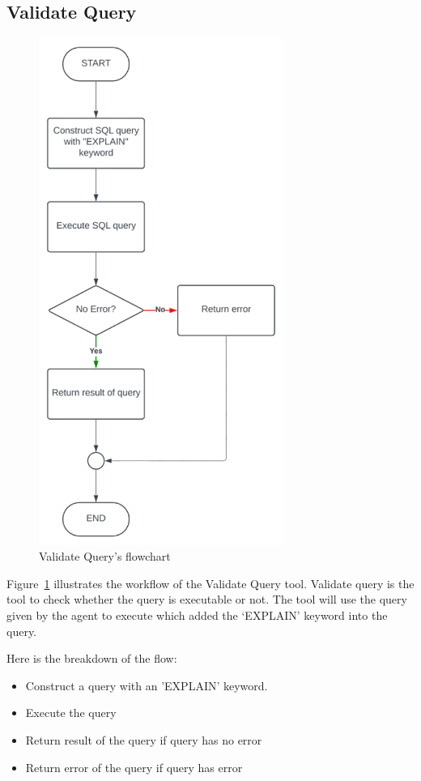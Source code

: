     \subsection{Validate Query}
    \begin{figure}[H]
        \centering
        \includegraphics[width=8cm]{chapters/3/figures/validate.png}
        \caption[Validate Query’s flowchart]{Validate Query’s flowchart}
        \label{fig:validate}
    \end{figure}
    Figure~\ref{fig:validate} illustrates the workflow of the Validate Query tool. Validate query is the tool to check whether the query is executable or not. The tool will use the query given by the agent to execute which added the ‘EXPLAIN’ keyword into the query.

    Here is the breakdown of the flow:
    \begin{itemize}
        \item  Construct a query with an 'EXPLAIN' keyword.
        \item  Execute the query
        \item  Return result of the query if query has no error
        \item  Return error of the query if query has error
    \end{itemize}
